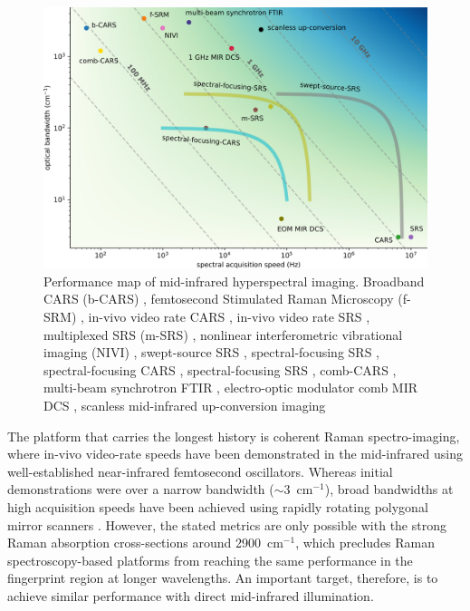\documentclass{optica-article}
\begin{document}
\begin{figure}[h]
    \centering
    \includegraphics[width=\linewidth]{bckgnd_with_cm_v2.png}
    \caption{Performance map of mid-infrared hyperspectral imaging. Broadband CARS (b-CARS) \cite{keeSimpleApproachOnelaser2004}, femtosecond Stimulated Raman Microscopy (f-SRM) \cite{ploetzFemtosecondStimulatedRaman2007}, in-vivo video rate CARS \cite{evansChemicalImagingTissue2005}, in-vivo video rate SRS \cite{saarVideoRateMolecularImaging2010}, multiplexed SRS (m-SRS) \cite{fuQuantitativeChemicalImaging2012,liaoMicrosecondScaleVibrational2015}, nonlinear interferometric vibrational imaging (NIVI) \cite{chowdaryMolecularHistopathologySpectrally2010}, swept-source SRS \cite{ozekiHighspeedMolecularSpectral2012}, spectral-focusing SRS \cite{fuHyperspectralImagingStimulated2013}, spectral-focusing CARS \cite{dinapoliHyperspectralDifferentialCARS2014}, spectral-focusing SRS \cite{linMicrosecondFingerprintStimulated2021}, comb-CARS \cite{ideguchiCoherentRamanSpectroimaging2013}, multi-beam synchrotron FTIR \cite{nasseHighresolutionFouriertransformInfrared2011}, electro-optic modulator comb MIR DCS \cite{ullahkhanDirectHyperspectralDualcomb2020}, scanless mid-infrared up-conversion imaging \cite{zhaoHighspeedScanlessEntire2023}}
    \label{fig:bckgnd}
\end{figure}


The platform that carries the longest history is coherent Raman spectro-imaging, where in-vivo video-rate speeds have been demonstrated in the mid-infrared \cite{evansChemicalImagingTissue2005, saarVideoRateMolecularImaging2010} using well-established near-infrared femtosecond oscillators. Whereas initial demonstrations were over a narrow bandwidth (\mbox{$\sim$3 $\mathrm{cm^{-1}}$}), broad bandwidths at high acquisition speeds have been achieved using rapidly rotating polygonal mirror scanners \cite{tamamitsuUltrafastBroadbandFouriertransform2017, linMicrosecondFingerprintStimulated2021}. However, the stated metrics are only possible with the strong Raman absorption cross-sections around \mbox{2900 $\mathrm{cm^{-1}}$}, which precludes Raman spectroscopy-based platforms from reaching the same performance in the fingerprint region at longer wavelengths. An important target, therefore, is to achieve similar performance with direct mid-infrared illumination.
\end{document}
